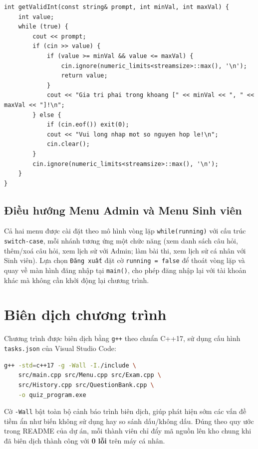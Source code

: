 \documentclass[11pt]{report}
\begin{document}
\begin{lstlisting}[caption={Bẫy lỗi nhập số nguyên (Menu.cpp)}, label={lst:getvalidint}]
int getValidInt(const string& prompt, int minVal, int maxVal) {
    int value;
    while (true) {
        cout << prompt;
        if (cin >> value) {
            if (value >= minVal && value <= maxVal) {
                cin.ignore(numeric_limits<streamsize>::max(), '\n');
                return value;
            }
            cout << "Gia tri phai trong khoang [" << minVal << ", " << maxVal << "]!\n";
        } else {
            if (cin.eof()) exit(0);
            cout << "Vui long nhap mot so nguyen hop le!\n";
            cin.clear();
        }
        cin.ignore(numeric_limits<streamsize>::max(), '\n');
    }
}
\end{lstlisting}

\subsection{Điều hướng Menu Admin và Menu Sinh viên}

Cả hai menu được cài đặt theo mô hình vòng lặp \texttt{while(running)} với cấu trúc \texttt{switch-case}, mỗi nhánh tương ứng một chức năng (xem danh sách câu hỏi, thêm/xoá câu hỏi, xem lịch sử với Admin; làm bài thi, xem lịch sử cá nhân với Sinh viên). Lựa chọn \texttt{Đăng xuất} đặt cờ \texttt{running = false} để thoát vòng lặp và quay về màn hình đăng nhập tại \texttt{main()}, cho phép đăng nhập lại với tài khoản khác mà không cần khởi động lại chương trình.

\section{Biên dịch chương trình}

Chương trình được biên dịch bằng \texttt{g++} theo chuẩn C++17, sử dụng cấu hình \texttt{tasks.json} của Visual Studio Code:

\begin{lstlisting}[language=bash, caption={Lệnh biên dịch chương trình}, label={lst:build}]
g++ -std=c++17 -g -Wall -I./include \
    src/main.cpp src/Menu.cpp src/Exam.cpp \
    src/History.cpp src/QuestionBank.cpp \
    -o quiz_program.exe
\end{lstlisting}

Cờ \texttt{-Wall} bật toàn bộ cảnh báo trình biên dịch, giúp phát hiện sớm các vấn đề tiềm ẩn như biến không sử dụng hay so sánh dấu/không dấu. Đúng theo quy ước trong README của dự án, mỗi thành viên chỉ đẩy mã nguồn lên kho chung khi đã biên dịch thành công với \textbf{0 lỗi} trên máy cá nhân.
\end{document}
